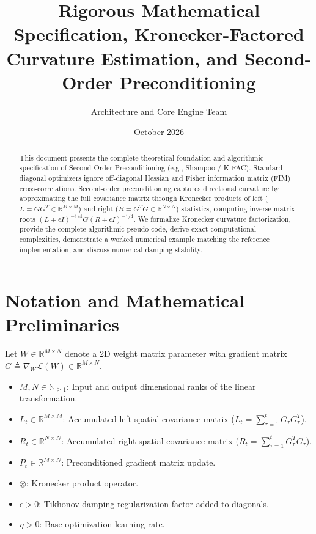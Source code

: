 \documentclass[11pt,a4paper]{article}
\title{\textbf{Rigorous Mathematical Specification, Kronecker-Factored Curvature Estimation, and Second-Order Preconditioning}}
\author{Architecture and Core Engine Team}
\date{October 2026}
\theoremstyle{definition}
\begin{document}
\maketitle

\begin{abstract}
This document presents the complete theoretical foundation and algorithmic specification of Second-Order Preconditioning (e.g., Shampoo / K-FAC). Standard diagonal optimizers ignore off-diagonal Hessian and Fisher information matrix (FIM) cross-correlations. Second-order preconditioning captures directional curvature by approximating the full covariance matrix through Kronecker products of left ($L = G G^T \in \mathbb{R}^{M \times M}$) and right ($R = G^T G \in \mathbb{R}^{N \times N}$) statistics, computing inverse matrix roots $(L + \epsilon I)^{-1/4} G (R + \epsilon I)^{-1/4}$. We formalize Kronecker curvature factorization, provide the complete algorithmic pseudo-code, derive exact computational complexities, demonstrate a worked numerical example matching the reference implementation, and discuss numerical damping stability.
\end{abstract}

\section{Notation and Mathematical Preliminaries}

Let $W \in \mathbb{R}^{M \times N}$ denote a 2D weight matrix parameter with gradient matrix $G \triangleq \nabla_W \mathcal{L}(W) \in \mathbb{R}^{M \times N}$.

\begin{itemize}
    \item $M, N \in \mathbb{N}_{\ge 1}$: Input and output dimensional ranks of the linear transformation.
    \item $L_t \in \mathbb{R}^{M \times M}$: Accumulated left spatial covariance matrix ($L_t = \sum_{\tau=1}^t G_\tau G_\tau^T$).
    \item $R_t \in \mathbb{R}^{N \times N}$: Accumulated right spatial covariance matrix ($R_t = \sum_{\tau=1}^t G_\tau^T G_\tau$).
    \item $P_t \in \mathbb{R}^{M \times N}$: Preconditioned gradient matrix update.
    \item $\otimes$: Kronecker product operator.
    \item $\epsilon > 0$: Tikhonov damping regularization factor added to diagonals.
    \item $\eta > 0$: Base optimization learning rate.
\end{itemize}
\end{document}
